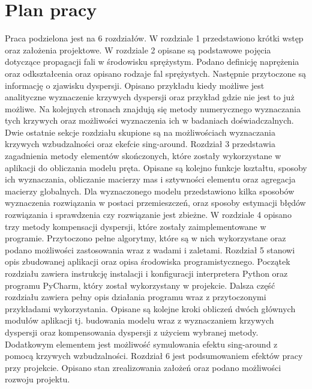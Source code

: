 \section{Plan pracy}
\label{sec:plan_pracy}

Praca podzielona jest na 6 rozdziałów. W rozdziale 1 przedstawiono krótki wstęp oraz założenia projektowe. W rozdziale 2 opisane są podstawowe pojęcia dotyczące propagacji fali w środowisku sprężystym. Podano definicję naprężenia oraz odkształcenia oraz opisano rodzaje fal sprężystych. Następnie przytoczone są informację o zjawisku dyspersji. Opisano przykładu kiedy możliwe jest analityczne wyznaczenie krzywych dyspersji oraz przykład gdzie nie jest to już możliwe. Na kolejnych stronach znajdują się metody numerycznego wyznaczania tych krzywych oraz możliwości wyznaczenia ich w badaniach doświadczalnych. Dwie ostatnie sekcje rozdziału skupione są na możliwościach wyznaczania krzywych wzbudzalności oraz ekefcie sing-around. Rozdział 3 przedstawia zagadnienia metody elementów skończonych, które zostały wykorzystane w aplikacji do obliczania modelu pręta. Opisane są kolejno funkcje kształtu, sposoby ich wyznaczania, obliczanie macierzy mas i sztywności elementu oraz agregacja macierzy globalnych. Dla wyznaczonego modelu przedstawiono kilka sposobów wyznaczenia rozwiązania w postaci przemieszczeń, oraz sposoby estymacji błędów rozwiązania i sprawdzenia czy rozwiązanie jest zbieżne. W rozdziale 4 opisano trzy metody kompensacji dyspersji, które zostały zaimplementowane w programie. Przytoczono pełne algorytmy, które są w nich wykorzystane oraz podano możliwości zastosowania wraz z wadami i zaletami. Rozdział 5 stanowi opis zbudowanej aplikacji oraz opisa środowiska programistycznego. Początek rozdziału zawiera instrukcję instalacji i konfiguracji interpretera Python oraz programu PyCharm, który został wykorzystany w projekcie. Dalsza część rozdziału zawiera pełny opis działania programu wraz z przytoczonymi przykładami wykorzystania. Opisane są kolejne kroki obliczeń dwóch głównych modułów aplikacji tj. budowania modelu wraz z wyznaczaniem krzywych dyspersji oraz kompensowania dyspersji z użyciem wybranej metody. Dodatkowym elementem jest możliwość symulowania efektu sing-around z pomocą krzywych wzbudzalności. Rozdział 6 jest podsumowaniem efektów pracy przy projekcie. Opisano stan zrealizowania założeń oraz podano możliwości rozwoju projektu.




















